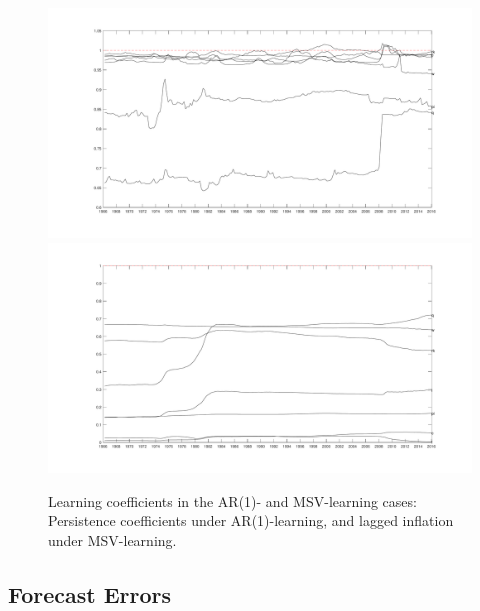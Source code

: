 \documentclass[12pt,reqno]{article}
\numberwithin{equation}{section}
\begin{document}
\begin{figure}[H]
\label{sw_learning_2}
\caption{Learning coefficients in the AR(1)- and MSV-learning cases: Persistence coefficients under AR(1)-learning, and lagged inflation under MSV-learning.} 
\vspace{5 mm}

\includegraphics[scale=0.5]{sw_ar1_learning_betas.pdf}\\
\includegraphics[scale=0.5]{sw_msv_learning_laggedInfl.pdf}\\
\end{figure}


\subsection{Forecast Errors}
\end{document}
